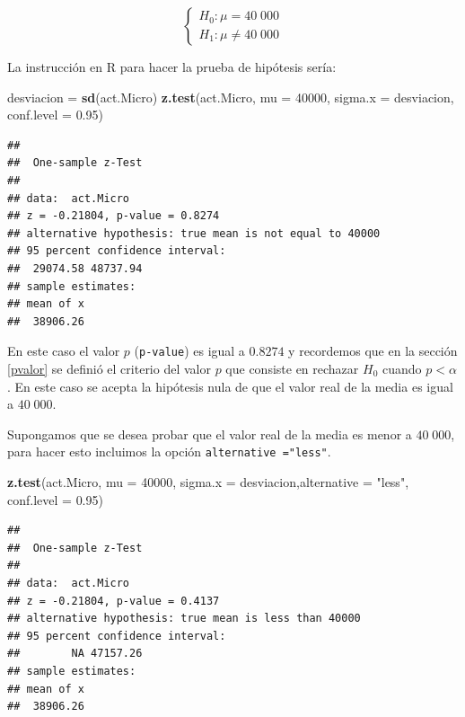 \documentclass[letterpaper,]{book}
\newenvironment{Shaded}{\begin{snugshade}}{\end{snugshade}}
\newcommand{\DataTypeTok}[1]{\textcolor[rgb]{0.13,0.29,0.53}{#1}}
\newcommand{\DecValTok}[1]{\textcolor[rgb]{0.00,0.00,0.81}{#1}}
\newcommand{\FloatTok}[1]{\textcolor[rgb]{0.00,0.00,0.81}{#1}}
\newcommand{\KeywordTok}[1]{\textcolor[rgb]{0.13,0.29,0.53}{\textbf{#1}}}
\newcommand{\NormalTok}[1]{#1}
\newcommand{\StringTok}[1]{\textcolor[rgb]{0.31,0.60,0.02}{#1}}
\begin{document}
\begin{equation} 
\begin{cases} 
H_0: \mu = 40\;000 \\ 
H_1: \mu \neq 40\;000
\end{cases} 
\end{equation}

La instrucción en R para hacer la prueba de hipótesis sería:

\begin{Shaded}
\begin{Highlighting}[]
\NormalTok{desviacion =}\StringTok{ }\KeywordTok{sd}\NormalTok{(act.Micro)}
\KeywordTok{z.test}\NormalTok{(act.Micro, }\DataTypeTok{mu =} \DecValTok{40000}\NormalTok{, }\DataTypeTok{sigma.x =}\NormalTok{ desviacion, }\DataTypeTok{conf.level =} \FloatTok{0.95}\NormalTok{)}
\end{Highlighting}
\end{Shaded}

\begin{verbatim}
## 
##  One-sample z-Test
## 
## data:  act.Micro
## z = -0.21804, p-value = 0.8274
## alternative hypothesis: true mean is not equal to 40000
## 95 percent confidence interval:
##  29074.58 48737.94
## sample estimates:
## mean of x 
##  38906.26
\end{verbatim}

En este caso el valor \(p\) (\texttt{p-value}) es igual a \(0.8274\) y recordemos que en la sección \ref{pvalor} se definió el criterio del valor \(p\) que consiste en rechazar \(H_0\) cuando \(p < \alpha\). En este caso se acepta la hipótesis nula de que el valor real de la media es igual a \(40\;000\).

Supongamos que se desea probar que el valor real de la media es menor a \(40\;000\), para hacer esto incluimos la opción \texttt{alternative\ ="less"}.

\begin{Shaded}
\begin{Highlighting}[]
\KeywordTok{z.test}\NormalTok{(act.Micro, }\DataTypeTok{mu =} \DecValTok{40000}\NormalTok{, }\DataTypeTok{sigma.x =}\NormalTok{ desviacion,}\DataTypeTok{alternative =} \StringTok{"less"}\NormalTok{,  }\DataTypeTok{conf.level =} \FloatTok{0.95}\NormalTok{)}
\end{Highlighting}
\end{Shaded}

\begin{verbatim}
## 
##  One-sample z-Test
## 
## data:  act.Micro
## z = -0.21804, p-value = 0.4137
## alternative hypothesis: true mean is less than 40000
## 95 percent confidence interval:
##        NA 47157.26
## sample estimates:
## mean of x 
##  38906.26
\end{verbatim}
\end{document}
